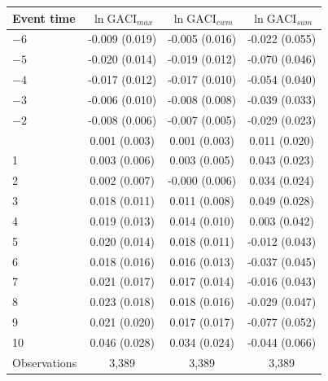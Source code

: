 \begin{tabular}{lccc}
\toprule
Event time & $\ln\mathrm{GACI}_{max}$ & $\ln\mathrm{GACI}_{cwm}$ & $\ln\mathrm{GACI}_{sum}$ \\
\midrule
$-6$ & -0.009 (0.019) & -0.005 (0.016) & -0.022 (0.055) \\
$-5$ & -0.020 (0.014) & -0.019 (0.012) & -0.070 (0.046) \\
$-4$ & -0.017 (0.012) & -0.017\sym{*} (0.010) & -0.054 (0.040) \\
$-3$ & -0.006 (0.010) & -0.008 (0.008) & -0.039 (0.033) \\
$-2$ & -0.008 (0.006) & -0.007 (0.005) & -0.029 (0.023) \\
\addlinespace
0 & 0.001 (0.003) & 0.001 (0.003) & 0.011 (0.020) \\
1 & 0.003 (0.006) & 0.003 (0.005) & 0.043\sym{*} (0.023) \\
2 & 0.002 (0.007) & -0.000 (0.006) & 0.034 (0.024) \\
3 & 0.018 (0.011) & 0.011 (0.008) & 0.049\sym{*} (0.028) \\
4 & 0.019 (0.013) & 0.014 (0.010) & 0.003 (0.042) \\
5 & 0.020 (0.014) & 0.018\sym{*} (0.011) & -0.012 (0.043) \\
6 & 0.018 (0.016) & 0.016 (0.013) & -0.037 (0.045) \\
7 & 0.021 (0.017) & 0.017 (0.014) & -0.016 (0.043) \\
8 & 0.023 (0.018) & 0.018 (0.016) & -0.029 (0.047) \\
9 & 0.021 (0.020) & 0.017 (0.017) & -0.077 (0.052) \\
10 & 0.046 (0.028) & 0.034 (0.024) & -0.044 (0.066) \\
\midrule
Observations & 3,389 & 3,389 & 3,389 \\
\bottomrule
\end{tabular}
